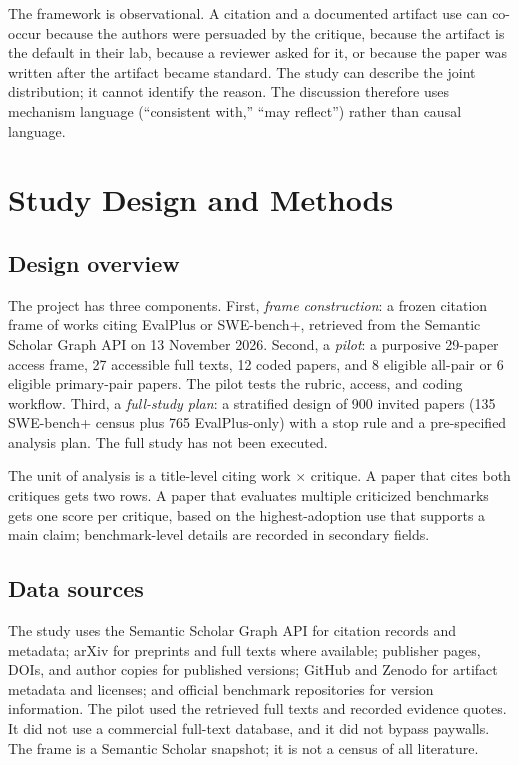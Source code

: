 \documentclass[11pt,a4paper]{article}
\begin{document}
The framework is observational. A citation and a documented artifact use can co-occur because the authors were persuaded by the critique, because the artifact is the default in their lab, because a reviewer asked for it, or because the paper was written after the artifact became standard. The study can describe the joint distribution; it cannot identify the reason. The discussion therefore uses mechanism language (``consistent with,'' ``may reflect'') rather than causal language.

\section{Study Design and Methods}

\subsection{Design overview}

The project has three components. First, \emph{frame construction}: a frozen citation frame of works citing EvalPlus or SWE-bench+, retrieved from the Semantic Scholar Graph API on 13 November 2026. Second, a \emph{pilot}: a purposive 29-paper access frame, 27 accessible full texts, 12 coded papers, and 8 eligible all-pair or 6 eligible primary-pair papers. The pilot tests the rubric, access, and coding workflow. Third, a \emph{full-study plan}: a stratified design of 900 invited papers (135 SWE-bench+ census plus 765 EvalPlus-only) with a stop rule and a pre-specified analysis plan. The full study has not been executed.

The unit of analysis is a title-level citing work $\times$ critique. A paper that cites both critiques gets two rows. A paper that evaluates multiple criticized benchmarks gets one score per critique, based on the highest-adoption use that supports a main claim; benchmark-level details are recorded in secondary fields.

\subsection{Data sources}

The study uses the Semantic Scholar Graph API for citation records and metadata; arXiv for preprints and full texts where available; publisher pages, DOIs, and author copies for published versions; GitHub and Zenodo for artifact metadata and licenses; and official benchmark repositories for version information. The pilot used the retrieved full texts and recorded evidence quotes. It did not use a commercial full-text database, and it did not bypass paywalls. The frame is a Semantic Scholar snapshot; it is not a census of all literature.
\end{document}
